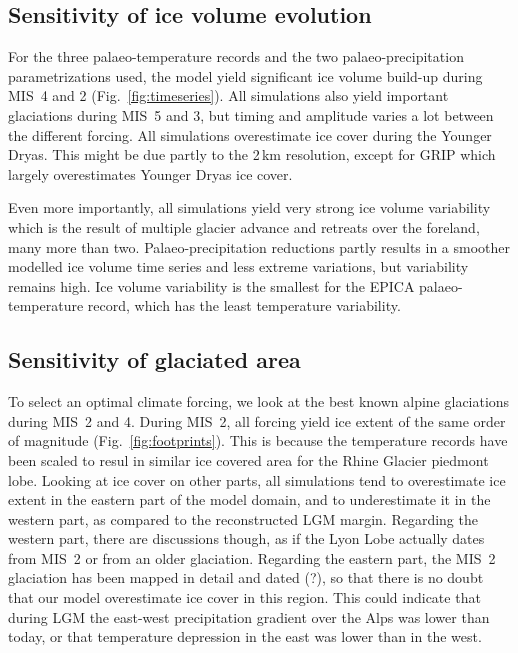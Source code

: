 \documentclass[tc, manuscript]{copernicus}
\begin{document}
\subsection{Sensitivity of ice volume evolution}
\label{sec:timeseries}

    For the three palaeo-temperature records and the two palaeo-precipitation
    parametrizations used, the model yield significant ice volume build-up
    during MIS~4 and 2 (Fig.~\ref{fig:timeseries}). All simulations also
    yield important glaciations during MIS~5 and 3, but timing and amplitude
    varies a lot between the different forcing. All simulations overestimate
    ice cover during the Younger Dryas. This might be due partly to the 2\,km
    resolution, except for GRIP which largely overestimates Younger Dryas ice
    cover.

    Even more importantly, all simulations yield very strong ice volume
    variability which is the result of multiple glacier advance and retreats
    over the foreland, many more than two. Palaeo-precipitation reductions
    partly results in a smoother modelled ice volume time series and less
    extreme variations, but variability remains high. Ice volume variability
    is the smallest for the EPICA palaeo-temperature record, which has the
    least temperature variability.


\subsection{Sensitivity of glaciated area}
\label{sec:footprints}

    To select an optimal climate forcing, we look at the best known alpine
    glaciations during MIS~2 and 4. During MIS~2, all forcing yield ice extent
    of the same order of magnitude (Fig.~\ref{fig:footprints}). This is
    because the temperature records have been scaled to resul in similar
    ice covered area for the Rhine Glacier piedmont lobe. Looking at ice cover
    on other parts, all simulations tend to overestimate ice extent in the
    eastern part of the model domain, and to underestimate it in the western
    part, as compared to the reconstructed LGM margin. Regarding the western
    part, there are discussions though, as if the Lyon Lobe actually dates from
    MIS~2 or from an older glaciation. Regarding the eastern part, the MIS~2
    glaciation has been mapped in detail and dated (?), so that there is no
    doubt that our model overestimate ice cover in this region. This could
    indicate that during LGM the east-west precipitation gradient over the Alps
    was lower than today, or that temperature depression in the east was lower
    than in the west.
\end{document}
